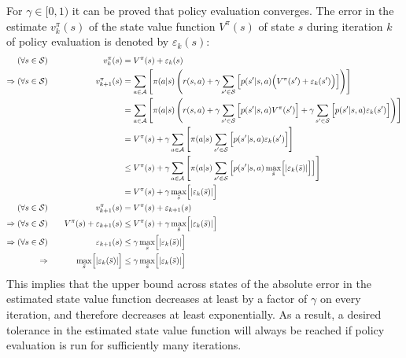 For $\gamma\in[0,1)$ it can be proved that policy evaluation converges. The error in the estimate $v_k^\pi(s)$ of the state value function $V^\pi(s)$ of state $s$ during iteration $k$ of policy evaluation is denoted by $\varepsilon_k(s)$:
\begin{align*}
    (\forall s\in\mathcal{S})\quad&& v_k^\pi(s) &= V^\pi(s) + \varepsilon_k(s) \\
    \Rightarrow(\forall s\in\mathcal{S})\quad&& v_{k+1}^\pi(s) &= \sum_{a\in\mathcal{A}}{\left[ \pi(a\vert s) \left( r(s, a) + \gamma\sum_{s'\in\mathcal{S}}{\left[ p(s'\vert s, a) \Bigl( V^\pi(s') + \varepsilon_k(s') \Bigr) \right]} \right) \right]} \\
    &&&= \sum_{a\in\mathcal{A}}{\left[ \pi(a\vert s) \left( r(s, a) + \gamma\sum_{s'\in\mathcal{S}}{\Bigl[ p(s'\vert s, a) V^\pi(s') \Bigr]} + \gamma\sum_{s'\in\mathcal{S}}{\Bigl[ p(s'\vert s, a) \varepsilon_k(s') \Bigr]} \right) \right]} \\
    &&&= V^\pi(s) + \gamma\sum_{a\in\mathcal{A}}{\left[ \pi(a\vert s) \sum_{s'\in\mathcal{S}}{\Bigl[ p(s'\vert s, a) \varepsilon_k(s') \Bigr]} \right]} \\
    &&&\le V^\pi(s) + \gamma\sum_{a\in\mathcal{A}}{\left[ \pi(a\vert s) \sum_{s'\in\mathcal{S}}{\left[ p(s'\vert s, a) \max_{\bar{s}}\Bigl[\left\vert \varepsilon_k(\bar{s}) \right\vert\Bigr] \right]} \right]} \\
    &&&= V^\pi(s) + \gamma\max_{\bar{s}}\Bigl[\left\vert \varepsilon_k(\bar{s}) \right\vert\Bigr] \\
    (\forall s\in\mathcal{S})\quad&& v_{k+1}^\pi(s) &= V^\pi(s) + \varepsilon_{k+1}(s) \\
    \Rightarrow(\forall s\in\mathcal{S})\quad&& V^\pi(s) + \varepsilon_{k+1}(s) &\le V^\pi(s) + \gamma\max_{\bar{s}}\Bigl[\left\vert \varepsilon_k(\bar{s}) \right\vert\Bigr] \\
    \Rightarrow(\forall s\in\mathcal{S})\quad&& \varepsilon_{k+1}(s) &\le \gamma\max_{\bar{s}}\Bigl[\left\vert \varepsilon_k(\bar{s}) \right\vert\Bigr] \\
    \Rightarrow\quad&& \max_{\bar{s}}\Bigl[\left\vert \varepsilon_k(\bar{s}) \right\vert\Bigr] &\le \gamma\max_{\bar{s}}\Bigl[\left\vert \varepsilon_k(\bar{s}) \right\vert\Bigr]
\end{align*}
This implies that the upper bound across states of the absolute error in the estimated state value function decreases at least by a factor of $\gamma$ on every iteration, and therefore decreases at least exponentially. As a result, a desired tolerance in the estimated state value function will always be reached if policy evaluation is run for sufficiently many iterations.
